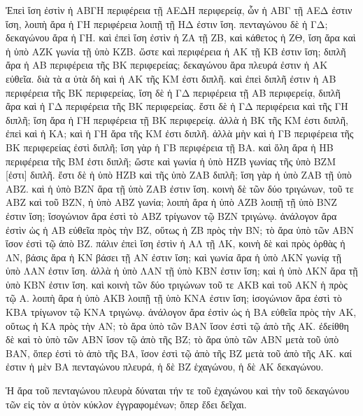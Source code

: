 \begin{Parallel}{}{}
{{\greekfont Ἐπεὶ ἴση ἐστὶν
ἡ ΑΒΓΗ περιφέρεια τῇ ΑΕΔΗ περιφερείᾳ, ὧν ἡ ΑΒΓ τῇ
ΑΕΔ ἐστιν ἴση, λοιπὴ ἄρα ἡ ΓΗ περιφέρεια λοιπῇ τῇ ΗΔ ἐστιν
ἴση. πενταγώνου δὲ ἡ ΓΔ; δεκαγώνου ἄρα ἡ ΓΗ. καὶ ἐπεὶ
ἴση ἐστὶν ἡ ΖΑ τῇ ΖΒ, καὶ κάθετος ἡ ΖΘ, ἴση ἄρα καὶ ἡ
ὑπὸ ΑΖΚ γωνία τῇ ὑπὸ ΚΖΒ. ὥστε καὶ περιφέρεια ἡ ΑΚ τῇ
ΚΒ ἐστιν ἴση; διπλῆ ἄρα ἡ ΑΒ περιφέρεια τῆς ΒΚ περιφερείας;
δεκαγώνου ἄρα πλευρά ἐστιν ἡ ΑΚ εὐθεῖα. διὰ τὰ α ὐτὰ
δὴ καὶ ἡ ΑΚ τῆς ΚΜ ἐστι διπλῆ. καὶ ἐπεὶ διπλῆ ἐστιν
ἡ ΑΒ περιφέρεια τῆς ΒΚ περιφερείας, ἴση δὲ ἡ ΓΔ περιφέρεια
τῇ ΑΒ περιφερείᾳ, διπλῆ ἄρα καὶ ἡ ΓΔ περιφέρεια
τῆς ΒΚ περιφερείας. ἔστι δὲ ἡ ΓΔ περιφέρεια καὶ τῆς ΓΗ διπλῆ; ἴση
ἄρα ἡ ΓΗ περιφέρεια τῇ ΒΚ περιφερείᾳ. ἀλλὰ ἡ ΒΚ τῆς ΚΜ ἐστι
διπλῆ, ἐπεὶ καὶ ἡ ΚΑ; καὶ ἡ ΓΗ ἄρα τῆς ΚΜ ἐστι διπλῆ.
ἀλλὰ μὴν καὶ ἡ ΓΒ περιφέρεια τῆς ΒΚ περιφερείας ἐστὶ διπλῆ;
ἴση γὰρ ἡ ΓΒ περιφέρεια τῇ ΒΑ. καὶ ὅλη ἄρα ἡ ΗΒ περιφέρεια
τῆς ΒΜ ἐστι διπλῆ; ὥστε καὶ γωνία ἡ ὑπὸ ΗΖΒ γωνίας τῆς
ὑπὸ ΒΖΜ [ἐστι] διπλῆ. ἔστι δὲ ἡ ὑπὸ ΗΖΒ καὶ τῆς ὑπὸ
ΖΑΒ διπλῆ; ἴση γὰρ ἡ ὑπὸ ΖΑΒ τῇ ὑπὸ ΑΒΖ. καὶ
ἡ ὑπὸ ΒΖΝ ἄρα τῇ ὑπὸ ΖΑΒ ἐστιν ἴση. κοινὴ δὲ τῶν
δύο τριγώνων, τοῦ τε ΑΒΖ καὶ τοῦ ΒΖΝ, ἡ ὑπὸ ΑΒΖ γωνία;
λοιπὴ ἄρα ἡ ὑπὸ ΑΖΒ λοιπῇ τῇ ὑπὸ ΒΝΖ ἐστιν ἴση;
ἴσογώνιον ἄρα ἐστὶ τὸ ΑΒΖ τρίγωνον τῷ ΒΖΝ τριγώνῳ. ἀνάλογον
ἄρα ἐστὶν ὡς ἡ ΑΒ εὐθεῖα πρὸς τὴν ΒΖ, οὕτως
ἡ ΖΒ πρὸς τὴν ΒΝ; τὸ ἄρα ὑπὸ τῶν ΑΒΝ ἴσον ἐστὶ τῷ
ἀπὸ ΒΖ. πάλιν ἐπεὶ ἴση ἐστὶν ἡ ΑΛ τῇ ΛΚ, κοινὴ δὲ καὶ
πρὸς ὀρθὰς ἡ ΛΝ, βάσις ἄρα ἡ ΚΝ βάσει τῇ ΑΝ ἐστιν
ἴση; καὶ γωνία ἄρα ἡ ὑπὸ ΛΚΝ γωνίᾳ τῇ ὑπὸ ΛΑΝ
ἐστιν ἴση. ἀλλὰ ἡ ὑπὸ ΛΑΝ τῇ ὑπὸ ΚΒΝ ἐστιν ἴση;
καὶ ἡ ὑπὸ ΛΚΝ ἄρα τῇ ὑπὸ ΚΒΝ ἐστιν ἴση. καὶ κοινὴ
τῶν δύο τριγώνων τοῦ τε ΑΚΒ καὶ τοῦ ΑΚΝ ἡ πρὸς τῷ Α.
λοιπὴ ἄρα ἡ ὑπὸ ΑΚΒ λοιπῇ τῇ ὑπὸ ΚΝΑ ἐστιν ἴση;
ἰσογώνιον ἄρα ἐστὶ τὸ ΚΒΑ τρίγωνον τῷ ΚΝΑ τριγώνῳ.
ἀνάλογον ἄρα ἐστὶν ὡς ἡ ΒΑ εὐθεῖα πρὸς τὴν ΑΚ, οὕτως
ἡ ΚΑ πρὸς τὴν ΑΝ; τὸ ἄρα ὑπὸ τῶν ΒΑΝ ἴσον ἐστὶ τῷ
ἀπὸ τῆς ΑΚ. ἐδείθθη δὲ καὶ τὸ ὑπὸ τῶν ΑΒΝ ἴσον τῷ ἀπὸ
τῆς ΒΖ; τὸ ἄρα ὑπὸ τῶν ΑΒΝ μετὰ τοῦ  ὑπὸ ΒΑΝ, ὅπερ
ἐστὶ τὸ ἀπὸ τῆς ΒΑ, ἴσον ἐστὶ τῷ ἀπὸ τῆς ΒΖ μετὰ τοῦ
ἀπὸ τῆς ΑΚ. καί ἐστιν ἡ μὲν ΒΑ πενταγώνου πλευρά, ἡ δὲ
ΒΖ ἑχαγώνου, ἡ δὲ ΑΚ δεκαγώνου.}

{\greekfont Ἡ ἄρα τοῦ πενταγώνου πλευρὰ δύναται τήν τε τοῦ ἑχαγώνου
καὶ τὴν τοῦ δεκαγώνου τῶν εἰς τὸν α ὐτὸν κύκλον ἐγγραφομένων;
ὅπερ ἔδει δεῖχαι.}}

\end{Parallel}

